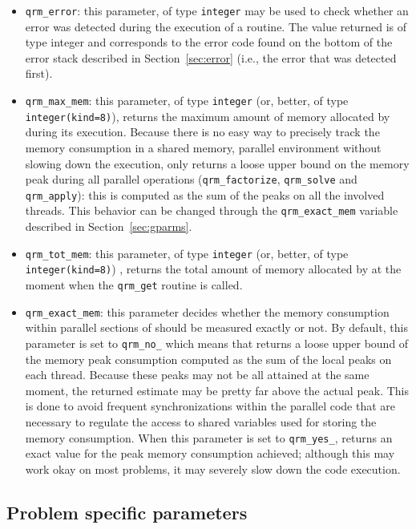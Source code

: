 \documentclass[11pt]{article}
\begin{document}
\begin{itemize}
\item \texttt{qrm\_error}: this parameter, of type \texttt{integer}
  may be used to check whether an error was detected during the
  execution of a \qrm routine. The value returned is of type integer
  and corresponds to the error code found on the bottom of the error
  stack described in Section~\ref{sec:error} (i.e., the error that was
  detected first).
\item \texttt{qrm\_max\_mem}: this parameter, of type \texttt{integer}
  (or, better, of type \texttt{integer(kind=8)}), returns the maximum
  amount of memory allocated by \qrm during its execution. Because
  there is no easy way to precisely track the memory consumption in a
  shared memory, parallel environment without slowing down the
  execution, \qrm only returns a loose upper bound on the memory
  peak during all parallel operations (\texttt{qrm\_factorize},
  \texttt{qrm\_solve} and \texttt{qrm\_apply}): this is computed as
  the sum of the peaks on all the involved threads. This behavior can
  be changed through the \texttt{qrm\_exact\_mem} variable described
  in Section~\ref{sec:gparms}.
\item \texttt{qrm\_tot\_mem}: this parameter, of type \texttt{integer}
  (or, better, of type \texttt{integer(kind=8)}) , returns the total
  amount of memory allocated by \qrm at the moment when the
  \texttt{qrm\_get} routine is called.
\item \texttt{qrm\_exact\_mem}: this parameter decides whether the
  memory consumption within parallel sections of \qrm should be
  measured exactly or not. By default, this parameter is set to
  \texttt{qrm\_no\_} which means that \qrm returns a loose upper bound
  of the memory peak consumption computed as the sum of the local
  peaks on each thread. Because these peaks may not be all attained at
  the same moment, the returned estimate may be pretty far above the
  actual peak. This is done to avoid frequent synchronizations within
  the parallel code that are necessary to regulate the access to
  shared variables used for storing the memory consumption. When this
  parameter is set to \texttt{qrm\_yes\_}, \qrm returns an exact value
  for the peak memory consumption achieved; although this may work
  okay on most problems, it may severely slow down the code execution.
\end{itemize}

\subsection{Problem specific parameters}
\label{sec:lparms}
\end{document}
